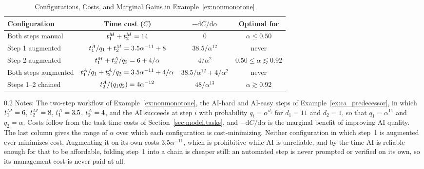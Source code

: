 \begin{table}[!t]
\centering
\caption{Configurations, Costs, and Marginal Gains in Example~\ref{ex:nonmonotone}}
\label{tab:nonmonotone_costs}
\singlespacing
\setlength{\tabcolsep}{10pt}
\begin{tabular}{lccc}
\toprule
Configuration & Time cost ($C$) & $-\mathrm{d}C/\mathrm{d}\alpha$ & Optimal for \\
\midrule
Both steps manual & $t^{M}_{1} + t^{M}_{2} = 14$ & $0$ & $\alpha \leq 0.50$ \\
\midrule
Step 1 augmented & $t^{A}_{1}/q_1 + t^{M}_{2} = 3.5\alpha^{-11} + 8$ & $38.5/\alpha^{12}$ & never \\
\midrule
Step 2 augmented & $t^{M}_{1} + t^{A}_{2}/q_2 = 6 + 4/\alpha$ & $4/\alpha^{2}$ & $0.50 \leq \alpha \lesssim 0.92$ \\
\midrule
Both steps augmented & $t^{A}_{1}/q_1 + t^{A}_{2}/q_2 = 3.5\alpha^{-11} + 4/\alpha$ & $38.5/\alpha^{12} + 4/\alpha^{2}$ & never \\
\midrule
Steps 1--2 chained & $t^{A}_{2}/(q_1 q_2) = 4\alpha^{-12}$ & $48/\alpha^{13}$ & $\alpha \gtrsim 0.92$ \\
\bottomrule
\end{tabular}
\par\vspace{\fignotesskip}
\begin{minipage}{1\linewidth}
\begin{spacing}{0.2}
{\fontsize{9.5pt}{10pt}\selectfont Notes: The two-step workflow of Example~\ref{ex:nonmonotone}, the AI-hard and AI-easy steps of Example~\ref{ex:ca_predecessor}, in which $t^{M}_{1}=6$, $t^{M}_{2}=8$, $t^{A}_{1}=3.5$, $t^{A}_{2}=4$, and the AI succeeds at step $i$ with probability $q_i = \alpha^{d_i}$ for $d_1 = 11$ and $d_2 = 1$, so that $q_1 = \alpha^{11}$ and $q_2 = \alpha$.
Costs follow from the task time costs of Section~\ref{sec:model.tasks}, and $-\mathrm{d}C/\mathrm{d}\alpha$ is the marginal benefit of improving AI quality.
The last column gives the range of $\alpha$ over which each configuration is cost-minimizing.
Neither configuration in which step~1 is augmented ever minimizes cost.
Augmenting it on its own costs $3.5\alpha^{-11}$, which is prohibitive while AI is unreliable, and by the time AI is reliable enough for that to be affordable, folding step~1 into a chain is cheaper still: an automated step is never prompted or verified on its own, so its management cost is never paid at all.}
\end{spacing}
\end{minipage}
\end{table}

